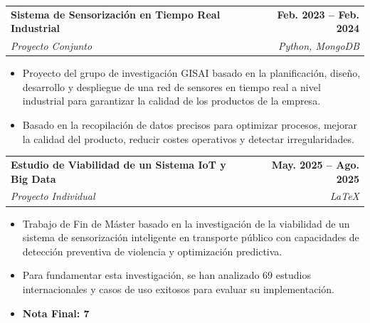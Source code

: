 \documentclass[a4paper,10pt]{article}
\makeatletter
\newcommand{\smallblacksquare}{\raisebox{0.4ex}{\rule{0.6ex}{0.6ex}}}
\newenvironment{projectlong}[4]
{
	\begin{tabularx}{\linewidth}{@{}l X r@{}}
		\textbf{#1} & \hfill & \textbf{#2} \\
		\small\textit{#3} & \hfill & \small\textit{#4} \\[3.75pt]
	\end{tabularx}
	\begin{minipage}[t]{\linewidth}
		\begin{itemize}[nosep,after=\strut, leftmargin=1em, itemsep=3pt,label=\smallblacksquare]
		}
		{
		\end{itemize}
	\end{minipage}    
}
\newenvironment{publicationlong}[4]
{
	\begin{tabularx}{\linewidth}{@{}l X r@{}}
		\textbf{#1} & \hfill & \textbf{#2} \\
		\small\textit{#3} & \hfill & \small\textit{#4} \\[3.75pt]
	\end{tabularx}
	\begin{minipage}[t]{\linewidth}
		\begin{itemize}[nosep,after=\strut, leftmargin=1em, itemsep=3pt,label=\smallblacksquare]
		}
		{
		\end{itemize}
	\end{minipage}    
}
\makeatother
\begin{document}
	\clearpage
	
	\begin{projectlong}{Sistema de Sensorización en Tiempo Real Industrial}{Feb. 2023 – Feb. 2024}{Proyecto Conjunto}{Python, MongoDB}
		\item Proyecto del grupo de investigación GISAI basado en la planificación, diseño, desarrollo y despliegue de una red de sensores en tiempo real a nivel industrial para garantizar la calidad de los productos de la empresa.
		\item Basado en la recopilación de datos precisos para optimizar procesos, mejorar la calidad del producto, reducir costes operativos y detectar irregularidades.
	\end{projectlong}
	
	\begin{projectlong}{Estudio de Viabilidad de un Sistema IoT y Big Data}{May. 2025 – Ago. 2025}{Proyecto Individual}{LaTeX}
		\item Trabajo de Fin de Máster basado en la investigación de la viabilidad de un sistema de sensorización inteligente en transporte público con capacidades de detección preventiva de violencia y optimización predictiva.
		\item Para fundamentar esta investigación, se han analizado 69 estudios internacionales y casos de uso exitosos para evaluar su implementación.
		\item \textbf{Nota Final: 7}
	\end{projectlong}
	
	
\end{document}
